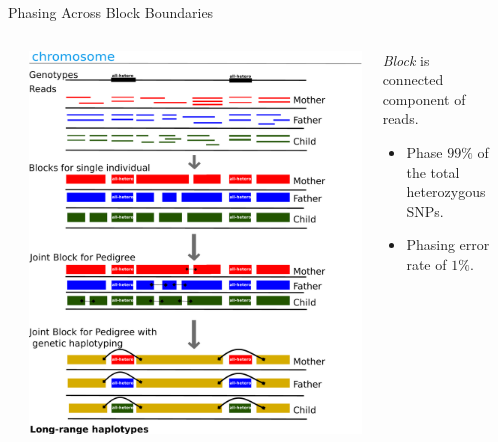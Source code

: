 \documentclass[notes=hide]{beamer}
\begin{document}
\begin{frame}{Phasing Across Block Boundaries}

	\begin{columns}[]
			\begin{column}{.1\textwidth}
				
			\end{column}
		\begin{column}{0.8\textwidth}
		\includegraphics[height=.8\textwidth, width=10\textwidth, keepaspectratio]{figs/long-haplotypes}
			
			\end{column}
       \hspace*{-2.5cm}
	\begin{column}{.48\textwidth}
			\begin{block}{}
				\emph{Block} is connected component of reads.
				
			\end{block}
	\begin{block}{}
			\begin{itemize}
				\item Phase $99\%$ of the total heterozygous SNPs.
				\item Phasing error rate of $1\%$.
			\end{itemize}
			
		\end{block}
		
	\end{column}
	\begin{column}{\textwidth}


\end{column}
\end{columns}
\end{frame}
\end{document}

